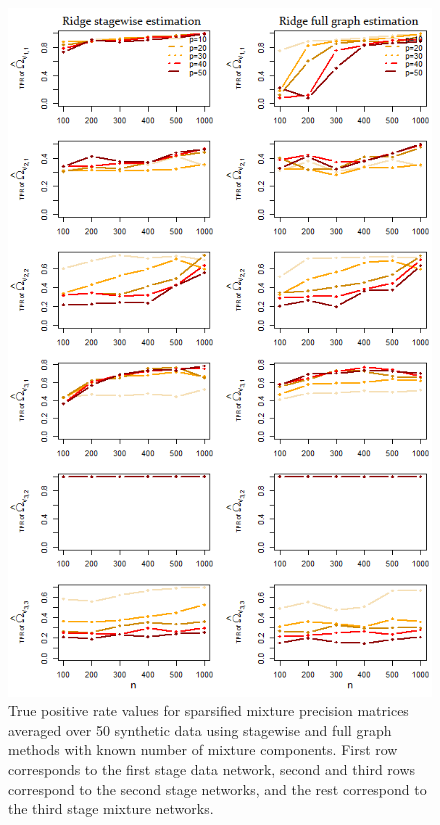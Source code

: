 \documentclass[10pt]{article}
\begin{document}
\begin{figure}
\begin{center}
 \includegraphics[scale=.6]{TPR.png}
\end{center}
\caption{True positive rate values for sparsified mixture precision matrices averaged over 50 synthetic data using stagewise and full graph methods with known number of mixture components. First row corresponds to the first stage data network, second and third rows correspond to the second stage networks, and the rest correspond to the third stage mixture networks.}
\label{fig:TPR}
\end{figure}
\end{document}
